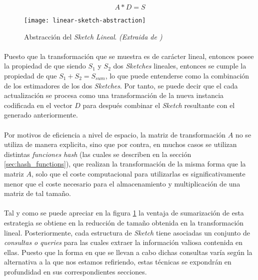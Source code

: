 \documentclass{subfiles}
\begin{document}
        \begin{equation}
        \label{eq:linear_sketch}
          A  * D = S
        \end{equation}

        \begin{figure}
          \centering
          \texttt{[image: linear-sketch-abstraction]}
          \caption{Abstracción del \emph{Sketch Lineal}. \emph{(Extraida de \cite{cormode2012synopses})}}
          \label{fig:linear_sketch}
        \end{figure}

        \paragraph{}
        Puesto que la transformación que se muestra es de carácter lineal, entonces posee la propiedad de que siendo $S_1$ y $S_2$ dos \emph{Sketches} lineales, entonces se cumple la propiedad de que $S_1 + S_2 = S_{sum}$, lo que puede entenderse como la combinación de los estimadores de los dos \emph{Sketches}. Por tanto, se puede decir que el cada actualización se procesa como una transformación de la nueva instancia codificada en el vector $D$ para después combinar el \emph{Sketch} resultante con el generado anteriormente.

        \paragraph{}
        Por motivos de eficiencia a nivel de espacio, la matriz de transformación $A$ no se utiliza de manera explicita, sino que por contra, en muchos casos se utilizan distintas \emph{funciones hash} (las cuales se describen en la sección \ref{sec:hash_functions}), que realizan la transformación de la misma forma que la matriz $A$, solo que el coste computacional para utilizarlas es significativamente menor que el coste necesario para el almacenamiento y multiplicación de una matriz de tal tamaño.

        \paragraph{}
        Tal y como se puede apreciar en la figura \ref{fig:linear_sketch} la ventaja de sumarización de esta estrategia se obtiene en la reducción de tamaño obtenida en la transformación lineal. Posteriormente, cada estructura de \emph{Sketch} tiene asociadas un conjunto de \emph{consultas o queries} para las cuales extraer la información valiosa contenida en ellas. Puesto que la forma en que se llevan a cabo dichas consultas varía según la alternativa a la que nos estamos refiriendo, estas técnicas se expondrán en profundidad en sus correspondientes secciones.
\end{document}
